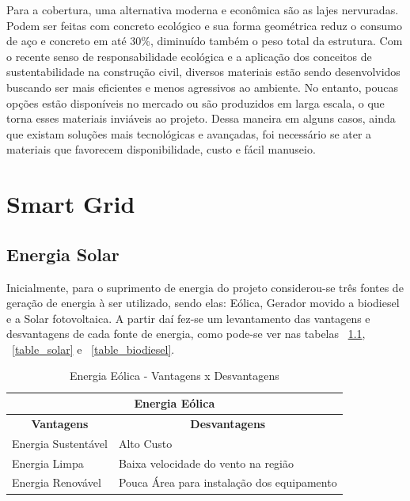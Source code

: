Para a cobertura, uma alternativa moderna e econômica são as lajes nervuradas. Podem ser feitas com concreto ecológico e sua forma geométrica reduz o consumo de aço e concreto em até 30\%, diminuído também o peso total da estrutura.
Com o recente senso de responsabilidade ecológica e a aplicação dos conceitos de sustentabilidade na construção civil, diversos materiais estão sendo desenvolvidos buscando ser mais eficientes e menos agressivos ao ambiente. No entanto, poucas opções estão disponíveis no mercado ou são produzidos em larga escala, o que torna esses materiais inviáveis ao projeto. Dessa maneira em alguns casos, ainda que existam soluções mais tecnológicas e avançadas, foi necessário se ater a materiais que favorecem disponibilidade, custo e fácil manuseio.


\chapter[Smart Grid]{Smart Grid}

\section{Energia Solar}
Inicialmente, para o suprimento de energia do projeto considerou-se três fontes de geração de energia à ser utilizado, sendo elas: Eólica, Gerador movido a biodiesel e a Solar fotovoltaica. A partir daí fez-se um levantamento das vantagens e desvantagens de cada fonte de energia, como pode-se ver nas tabelas ~\ref{table_eolica}, ~\ref{table_solar} e ~\ref{table_biodiesel}.

\begin{table}[h]
  \centering
  \caption{Energia Eólica - Vantagens x Desvantagens}
  \label{table_eolica}
  \begin{tabular}{|l|l|}
    \hline
    \multicolumn{2}{|c|}{\textbf{Energia Eólica}}                                         \\ \hline
    \multicolumn{1}{|c|}{\textbf{Vantagens}} & \multicolumn{1}{c|}{\textbf{Desvantagens}} \\ \hline
    Energia Sustentável                      & Alto Custo                                 \\ \hline
    Energia Limpa                            & Baixa velocidade do vento na região        \\ \hline
    Energia Renovável                        & Pouca Área para instalação dos equipamento \\ \hline
  \end{tabular}
\end{table}

